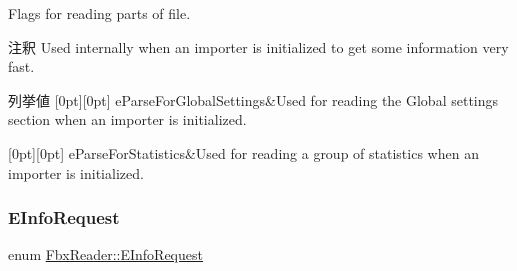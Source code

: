 Flags for reading parts of file. \begin{DoxyRemark}{注釈}
Used internally when an importer is initialized to get some information very fast. 
\end{DoxyRemark}
\begin{DoxyEnumFields}{列挙値}
[0pt][0pt]{}\mbox{\label{class_fbx_reader_a1a14bd907bcda7dd48ba9b0a6236b7b8a916239cfabb05bb13e64fab696226011}} 
e\+Parse\+For\+Global\+Settings&Used for reading the Global settings section when an importer is initialized. \\
\hline

[0pt][0pt]{}\mbox{\label{class_fbx_reader_a1a14bd907bcda7dd48ba9b0a6236b7b8a31ba0d93719d2c2670ef2323447a8041}} 
e\+Parse\+For\+Statistics&Used for reading a group of statistics when an importer is initialized. \\
\hline

\end{DoxyEnumFields}
\mbox{\label{class_fbx_reader_a33badbb2641958ab0772ec2c06a71e11}} 
\subsubsection{\texorpdfstring{E\+Info\+Request}{EInfoRequest}}
{\footnotesize\ttfamily enum \hyperlink{class_fbx_reader_a33badbb2641958ab0772ec2c06a71e11}{Fbx\+Reader\+::\+E\+Info\+Request}}

